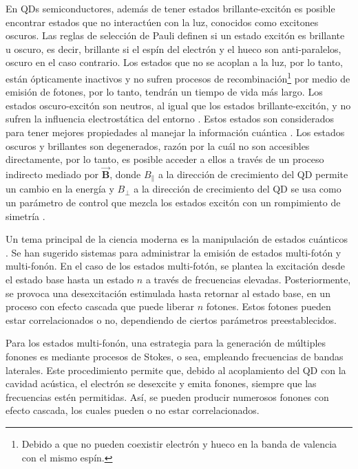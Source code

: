 \documentclass[main.tex]{subfiles}
\begin{document}
En QDs semiconductores, además de tener estados brillante-excitón es posible encontrar estados que no interactúen con la luz, conocidos como excitones oscuros. Las reglas de selección de Pauli definen si un estado excitón es brillante u oscuro, es decir, brillante si el espín del electrón y el hueco son anti-paralelos, oscuro en el caso contrario. Los estados que no se acoplan a la luz, por lo tanto, están ópticamente inactivos y no sufren procesos de recombinación\footnote{Debido a que no pueden coexistir electrón y hueco en la banda de valencia con el mismo espín.} por medio de emisión de fotones, por lo tanto, tendrán un tiempo de vida más largo. Los estados oscuro-excitón son neutros, al igual que los estados brillante-excitón, y no sufren la influencia electrostática del entorno \parencite{Jimenez2017}. Estos estados son considerados para tener mejores propiedades al manejar la información cuántica \parencite{Poem2010}. Los estados oscuros y brillantes son degenerados, razón por la cuál no son accesibles directamente, por lo tanto, es posible acceder a ellos a través de un proceso indirecto mediado por $\vec{\mathbf{B}}$, donde $B_\parallel$ a la dirección de crecimiento del QD permite un cambio en la energía y $B_\perp$ a la dirección de crecimiento del QD se usa como un parámetro de control que mezcla los estados excitón con un rompimiento de simetría \parencite{Bayer2000}.

Un tema principal de la ciencia moderna es la manipulación de estados cuánticos \parencite{Bin2020}. Se han sugerido sistemas para administrar la emisión de estados multi-fotón y multi-fonón. En el caso de los estados multi-fotón, se plantea la excitación desde el estado base hasta un estado $n$ a través de frecuencias elevadas. Posteriormente, se provoca una desexcitación estimulada hasta retornar al estado base, en un proceso con efecto cascada que puede liberar $n$ fotones. Estos fotones pueden estar correlacionados o no, dependiendo de ciertos parámetros preestablecidos.

Para los estados multi-fonón, una estrategia para la generación de múltiples fonones es mediante procesos de Stokes, o sea, empleando frecuencias de bandas laterales. Este procedimiento permite que, debido al acoplamiento del QD con la cavidad acústica, el electrón se desexcite y emita fonones, siempre que las frecuencias estén permitidas. Así, se pueden producir numerosos fonones con efecto cascada, los cuales pueden o no estar correlacionados.
\end{document}
